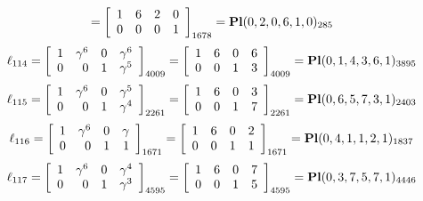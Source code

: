 \documentclass{article}
\begin{document}
{$$=
\left[
\begin{array}{*{4}c}
1  & 6  & 2  & 0\\
0  & 0  & 0  & 1\\
\end{array}
\right]_{1678}
={\rm\bf Pl}(0,2,0,6,1,0 )_{285}$$
$$
\ell_{114} = 
\left[
\begin{array}{*{4}{r}}
1 & \gamma^{6} & 0 & \gamma^{6}\\
0 & 0 & 1 & \gamma^{5}\\
\end{array}
\right]
_{4009}
=
\left[
\begin{array}{*{4}c}
1  & 6  & 0  & 6\\
0  & 0  & 1  & 3\\
\end{array}
\right]_{4009}
={\rm\bf Pl}(0,1,4,3,6,1 )_{3895}$$
$$
\ell_{115} = 
\left[
\begin{array}{*{4}{r}}
1 & \gamma^{6} & 0 & \gamma^{5}\\
0 & 0 & 1 & \gamma^{4}\\
\end{array}
\right]
_{2261}
=
\left[
\begin{array}{*{4}c}
1  & 6  & 0  & 3\\
0  & 0  & 1  & 7\\
\end{array}
\right]_{2261}
={\rm\bf Pl}(0,6,5,7,3,1 )_{2403}$$
$$
\ell_{116} = 
\left[
\begin{array}{*{4}{r}}
1 & \gamma^{6} & 0 & \gamma \\
0 & 0 & 1 & 1\\
\end{array}
\right]
_{1671}
=
\left[
\begin{array}{*{4}c}
1  & 6  & 0  & 2\\
0  & 0  & 1  & 1\\
\end{array}
\right]_{1671}
={\rm\bf Pl}(0,4,1,1,2,1 )_{1837}$$
$$
\ell_{117} = 
\left[
\begin{array}{*{4}{r}}
1 & \gamma^{6} & 0 & \gamma^{4}\\
0 & 0 & 1 & \gamma^{3}\\
\end{array}
\right]
_{4595}
=
\left[
\begin{array}{*{4}c}
1  & 6  & 0  & 7\\
0  & 0  & 1  & 5\\
\end{array}
\right]_{4595}
={\rm\bf Pl}(0,3,7,5,7,1 )_{4446}$$
}
\end{document}
